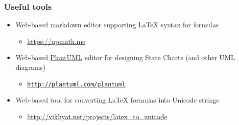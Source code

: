 \documentclass[handout]{beamer}\mode<presentation>{\usetheme{AMSCesenaBleu}}
\begin{document}
\begin{frame}\label{useful-tools}
\frametitle{Useful tools}
    
    \begin{itemize}
        \item Web-based markdown editor supporting \LaTeX{} syntax for formulas
        \begin{itemize}
            \item \url{https://upmath.me}
        \end{itemize}
        
        \vfill
        
        \item Web-based \href{http://plantuml.com/}{PlantUML} editor for designing State Charts (and other UML diagrams)
        \begin{itemize}
            \item \href{http://www.plantuml.com/plantuml/uml/XOz1JW8n58RtFSLRWWbaW1qXG4HCt60Yi48MpVI93Prsqhwget4XmSG5rt2XPp7n3dCI2uYEoIGkclxfz_wlUNr7t99F57DBgLDkUG8dUCMzebEZQIpl4PfH0Ow94-uGPGf14bSoTkNj4KyG1iPRYPPTIu60IKeP27InbIb9ercXwRPgU600npnUBgpnMWoCChRJ6MeXzQBR1QFa3PPDJ3NUfI6X25CPAcLksIDZiwCvr6fTS17RwKDeW_5KeNprLAr_frMrBdM5FjQ_TmJvosiupyn5UqEZKBpKi_Ff9AGvEtW3_jUsUTksyyqxSuszjDc6ptMmdOt6mul9_EUzLR2LVDQ4lnkteTVh7M2h5FPH2v-eBm00}{\texttt{http://plantuml.com/plantuml}}
        \end{itemize}
        
        \vfill
        
        \item Web-based tool for converting \LaTeX{} formulas into Unicode strings
        \begin{itemize}
            \item \url{http://vikhyat.net/projects/latex_to_unicode}
        \end{itemize}
    \end{itemize}
    
\end{frame}

\maketitle

\end{document}
